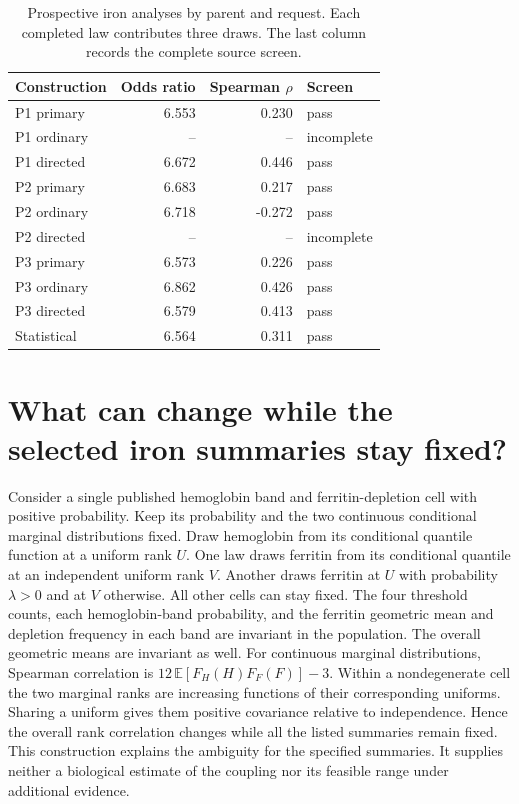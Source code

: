 \begin{table}[H]
\caption{Prospective iron analyses by parent and request. Each completed law contributes three draws. The last column records the complete source screen.}
\label{tab:ironprospective}
\centering
\begin{tabular}{@{}lrrl@{}}
\toprule
Construction & Odds ratio & Spearman $\rho$ & Screen\\
\midrule
P1 primary & 6.553 & 0.230 & pass\\
P1 ordinary & -- & -- & incomplete\\
P1 directed & 6.672 & 0.446 & pass\\
P2 primary & 6.683 & 0.217 & pass\\
P2 ordinary & 6.718 & -0.272 & pass\\
P2 directed & -- & -- & incomplete\\
P3 primary & 6.573 & 0.226 & pass\\
P3 ordinary & 6.862 & 0.426 & pass\\
P3 directed & 6.579 & 0.413 & pass\\
Statistical & 6.564 & 0.311 & pass\\
\bottomrule
\end{tabular}
\end{table}

\section{What can change while the selected iron summaries stay fixed?}
\label{app:ironproof}
Consider a single published hemoglobin band and ferritin-depletion cell with positive probability. Keep its probability and the two continuous conditional marginal distributions fixed. Draw hemoglobin from its conditional quantile function at a uniform rank $U$. One law draws ferritin from its conditional quantile at an independent uniform rank $V$. Another draws ferritin at $U$ with probability $\lambda>0$ and at $V$ otherwise. All other cells can stay fixed. The four threshold counts, each hemoglobin-band probability, and the ferritin geometric mean and depletion frequency in each band are invariant in the population. The overall geometric means are invariant as well.
For continuous marginal distributions, Spearman correlation is $12\,\mathbb{E}[F_H(H)F_F(F)]-3$. Within a nondegenerate cell the two marginal ranks are increasing functions of their corresponding uniforms. Sharing a uniform gives them positive covariance relative to independence. Hence the overall rank correlation changes while all the listed summaries remain fixed. This construction explains the ambiguity for the specified summaries. It supplies neither a biological estimate of the coupling nor its feasible range under additional evidence.

